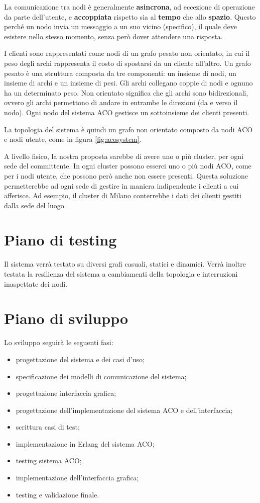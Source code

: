 La comunicazione tra nodi è generalmente \textbf{asincrona}, ad eccezione di operazione da parte dell'utente, e \textbf{accoppiata} rispetto sia al \textbf{tempo} che allo \textbf{spazio}.
Questo perché un nodo invia un messaggio a un suo vicino (specifico), il quale deve esistere nello stesso momento, senza però dover attendere una risposta.

I clienti sono rappresentati come nodi di un grafo pesato non orientato, in cui il peso degli archi rappresenta il costo di spostarsi da un cliente all'altro.
Un grafo pesato è una struttura composta da tre componenti: un insieme di nodi, un insieme di archi e un insieme di pesi. Gli archi collegano coppie di nodi e ognuno ha un determinato peso.
Non orientato significa che gli archi sono bidirezionali, ovvero gli archi permettono di andare in entrambe le direzioni (da e verso il nodo).
Ogni nodo del sistema ACO gestisce un sottoinsieme dei clienti presenti.

La topologia del sistema è quindi un grafo non orientato composto da nodi ACO e nodi utente, come in figura \ref{fig:acosystem}.

A livello fisico, la nostra proposta sarebbe di avere uno o più cluster, per ogni sede del committente.
In ogni cluster possono esserci uno o più nodi ACO, come per i nodi utente, che possono però anche non essere presenti.
Questa soluzione permetterebbe ad ogni sede di gestire in maniera indipendente i clienti a cui afferisce.
Ad esempio, il cluster di Milano conterrebbe i dati dei clienti gestiti dalla sede del luogo.

\section{Piano di testing}
Il sistema verrà testato su diversi grafi casuali, statici e dinamici. Verrà inoltre testata la resilienza del sistema a cambiamenti della topologia
e interruzioni inaspettate dei nodi.


\section{Piano di sviluppo}
Lo sviluppo seguirà le seguenti fasi:
\begin{itemize}
    \item progettazione del sistema e dei casi d'uso;
    \item specificazione dei modelli di comunicazione del sistema;
    \item progettazione interfaccia grafica;
    \item progettazione dell'implementazione del sistema ACO e dell'interfaccia;
    \item scrittura casi di test;
    \item implementazione in Erlang del sistema ACO;
    \item testing sistema ACO;
    \item implementazione dell'interfaccia grafica;
    \item testing e validazione finale.
\end{itemize}